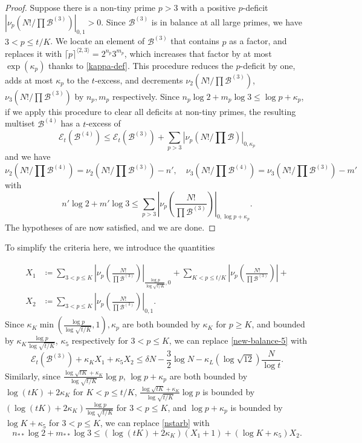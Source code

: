 \documentclass[12pt,a4paper,reqno]{amsart}
\numberwithin{equation}{section}
\theoremstyle{plain}
\theoremstyle{definition}
\newcommand\tuple{{\mathcal B}}
\newcommand\excess{{\mathcal{E}}}
\begin{document}
\begin{proof} Suppose there is a non-tiny prime $p>3$ with a positive $p$-deficit
$|\nu_p(N!/\prod \tuple^{(3)})|_{0,1} > 0$.  Since $\tuple^{(3)}$ is in balance at all large primes, we have $3 < p \leq t/K$.  We locate an element of $\tuple^{(3)}$ that contains $p$ as a factor, and replaces it with $\lceil p \rceil^{\langle 2,3 \rangle} = 2^{n_p} 3^{m_p}$, which increases that factor by at most $\exp(\kappa_{p})$ thanks to \eqref{kappa-def}.  This procedure reduces the $p$-deficit by one, adds at most $\kappa_{p}$ to the $t$-excess, and decrements $\nu_2(N!/\prod \tuple^{(3)})$, $\nu_3(N!/\prod \tuple^{(3)})$ by $n_{p}, m_{p}$ respectively.  Since $n_{p} \log 2 + m_{p} \log 3 \leq \log p + \kappa_{p}$, if we apply this procedure to clear all deficits at non-tiny primes, the resulting multiset $\tuple^{(4)}$ has a $t$-excess of
$$ \excess_t(\tuple^{(4)}) \leq \excess_t(\tuple^{(3)})  + \sum_{p > 3} |\nu_p(N!/\prod \tuple)|_{0,\kappa_p}$$
and we have
$$ \nu_2(N!/\prod \tuple^{(4)}) = \nu_2(N!/\prod \tuple^{(3)}) - n', \quad \nu_3(N!/\prod \tuple^{(4)}) = \nu_3(N!/
\prod \tuple^{(3)}) - m'$$
with
$$n' \log 2 + m' \log 3 \leq \sum_{p>3} \left|\nu_p\left(\frac{N!}{\prod \tuple^{(3)}}\right)\right|_{0, \log p+\kappa_{p}}.$$  
The hypotheses of  are now satisfied, and we are done.
\end{proof}

To simplify the criteria here, we introduce the quantities

\begin{align}
X_1 &\coloneqq \sum_{3 < p \leq K} \left|\nu_p\left(\frac{N!}{\prod \tuple^{(3)}}\right)\right|_{\frac{\log p}{\log\sqrt{t/K}},0} + \sum_{K < p \leq t/K} \left|\nu_p\left(\frac{N!}{\prod \tuple^{(3)}}\right)\right| +  \label{x1-def}\\
X_2 &\coloneqq \sum_{3 < p \leq K} \left|\nu_p\left(\frac{N!}{\prod \tuple^{(3)}}\right)\right|_{0,1}.\label{x2-def}
\end{align}
Since $\kappa_K \min(\frac{\log p}{\log\sqrt{t/K}},1),\kappa_p$ are both bounded by $\kappa_K$ for $p \geq K$, and bounded by $\kappa_K \frac{\log p}{\log\sqrt{t/K}}$, $\kappa_5$ respectively for $3 < p \leq K$, we can replace \eqref{new-balance-5} with 
\begin{equation}\label{new-balance-6}
      \excess_t(\tuple^{(3)}) + \kappa_K X_1 + \kappa_5 X_2 \leq \delta N - \frac{3}{2} \log N - \kappa_L (\log \sqrt{12}) \frac{N}{\log t}.
\end{equation}
Similarly, since $\frac{\log \sqrt{tK} + \kappa_K}{\log\sqrt{t/K}} \log p$, $\log p + \kappa_p$ are both bounded by $\log(tK) + 2\kappa_K$ for $K < p \leq t/K$, $\frac{\log \sqrt{tK} + \kappa_K}{\log\sqrt{t/K}} \log p$ is bounded by 
$(\log(tK) + 2\kappa_K) \frac{\log p}{\log\sqrt{t/K}}$ for $3 < p \leq K$, and $\log p + \kappa_p$ is bounded by $\log K + \kappa_5$ for $3 < p \leq K$, we can replace \eqref{nstarb} with
\begin{equation}\label{nstarb-2}
 n_{**} \log 2 + m_{**} \log 3 \leq
 (\log(tK) + 2\kappa_K) (X_1+1) + (\log K+\kappa_5) X_2.
\end{equation}
\end{document}
